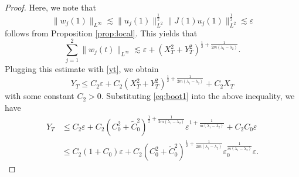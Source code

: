 \documentclass[11pt,a4paper,twosides]{amsart}
\theoremstyle{plain}
\theoremstyle{remark}
\numberwithin{equation}{section}
\def\le{\leqslant}
\theoremstyle{definition}
\newcommand{\1}{{\bf 1}_{\{|x| < |t|\}}}
\renewcommand{\epsilon}{\varepsilon}
\renewcommand{\tilde}{\widetilde}
\begin{document}
\begin{proof}
  Here, we note that 
\[
\|w_j(1)\|_{L^\infty} \lesssim\|u_j(1)\|_{L^2}^\frac12 
\|J(1)u_j(1)\|_{L^2}^ \frac12 \lesssim\epsilon
\]
follows from Proposition \ref{prop:local}.
This yields that
\begin{equation*}
    \sum_{j=1}^2\|w_j(t)\|_{L^\infty} \lesssim \epsilon + (X_T^2 + Y_T^2)^{\frac{1}{2}+\frac{1}{2m(\lambda_1-\lambda_2)}}.
  \end{equation*}
 Plugging this estimate with \eqref{yt}, we obtain
  \begin{equation*}
    Y_T \le C_2\epsilon + C_2(X_T^2 + Y_T^2)^{\frac{1}{2}+\frac{1}{2m(\lambda_1-\lambda_2)}} + C_2X_T
  \end{equation*}
  with some constant $C_2>0$.
  Substituting 
  \eqref{eq:boot1} into the above inequality, 
  we have
  \begin{align}
Y_T & \le C_2\epsilon + C_2(C_0^2 + \tilde{C}_0^2)^{\frac{1}{2}+\frac{1}{2m(\lambda_1-\lambda_2)}}
    \epsilon^{1+\frac{1}{m(\lambda_1-\lambda_2)}} + C_2C_0\epsilon        
                  \label{eq:YT1}    \\
                  & \le C_2(1+C_0)\epsilon
    + C_2(C_0^2 + \tilde{C}_0^2)^{\frac{1}{2}+\frac{1}{2m(\lambda_1-\lambda_2)}}\epsilon_0^{\frac{1}{m(\lambda_1-\lambda_2)}}\epsilon.
    \nonumber
  \end{align}
  

\end{proof}
\end{document}
